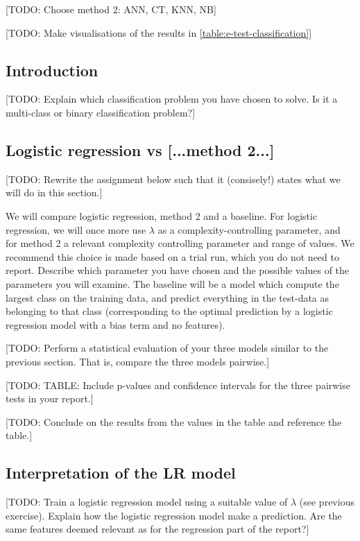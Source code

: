 \documentclass[dtu]{dtuarticle}
\newcommand{\todo}[1]{\color{red}[TODO: #1]\color{black}}
\begin{document}
	\todo{Choose method 2: ANN, CT, KNN, NB}

	\todo{Make visualisations of the results in \ref{table:e-test-classification}}

	\subsection{Introduction}

	\todo{Explain which classification problem you have chosen to solve. Is it a multi-class or binary
		classification problem?}

	\subsection{Logistic regression vs [...method 2...]}

	\todo{Rewrite the assignment below such that it (consisely!) states what we will do in this section.}

	We will compare logistic regression, method 2 and a baseline. For logistic regression, we
	will once more use $\lambda$ as a complexity-controlling parameter, and for method 2 a relevant
	complexity controlling parameter and range of values. We recommend this choice is made
	based on a trial run, which you do not need to report. Describe which parameter you have
	chosen and the possible values of the parameters you will examine. The baseline will be a
	model which compute the largest class on the training data, and predict everything in the
	test-data as belonging to that class (corresponding to the optimal prediction by a logistic
	regression model with a bias term and no features).

	\todo{Perform a statistical evaluation of your three models similar to the previous section. That
		is, compare the three models pairwise.}

	\todo{TABLE: Include p-values and confidence intervals for the three pairwise tests in your report.}

	\todo{Conclude on the results from the values in the table and reference the table.}

	\subsection{Interpretation of the LR model}

	\todo{Train a logistic regression model using a suitable value of $\lambda$ (see previous exercise). Explain
		how the logistic regression model make a prediction. Are the same features deemed relevant
		as for the regression part of the report?}
\end{document}
